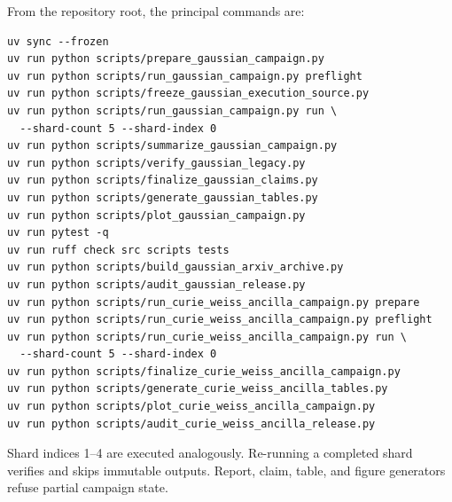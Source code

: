 From the repository root, the principal commands are:
\begin{verbatim}
uv sync --frozen
uv run python scripts/prepare_gaussian_campaign.py
uv run python scripts/run_gaussian_campaign.py preflight
uv run python scripts/freeze_gaussian_execution_source.py
uv run python scripts/run_gaussian_campaign.py run \
  --shard-count 5 --shard-index 0
uv run python scripts/summarize_gaussian_campaign.py
uv run python scripts/verify_gaussian_legacy.py
uv run python scripts/finalize_gaussian_claims.py
uv run python scripts/generate_gaussian_tables.py
uv run python scripts/plot_gaussian_campaign.py
uv run pytest -q
uv run ruff check src scripts tests
uv run python scripts/build_gaussian_arxiv_archive.py
uv run python scripts/audit_gaussian_release.py
uv run python scripts/run_curie_weiss_ancilla_campaign.py prepare
uv run python scripts/run_curie_weiss_ancilla_campaign.py preflight
uv run python scripts/run_curie_weiss_ancilla_campaign.py run \
  --shard-count 5 --shard-index 0
uv run python scripts/finalize_curie_weiss_ancilla_campaign.py
uv run python scripts/generate_curie_weiss_ancilla_tables.py
uv run python scripts/plot_curie_weiss_ancilla_campaign.py
uv run python scripts/audit_curie_weiss_ancilla_release.py
\end{verbatim}
Shard indices 1--4 are executed analogously.  Re-running a completed shard
verifies and skips immutable outputs.  Report, claim, table, and figure
generators refuse partial campaign state.
